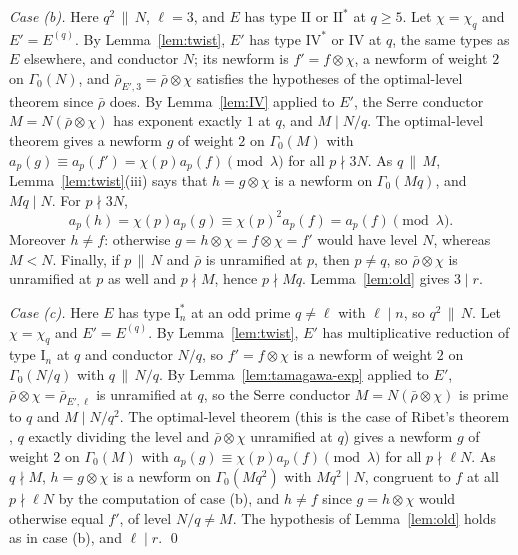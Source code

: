 \documentclass[11pt]{amsart}
\theoremstyle{definition}
\begin{document}
\medskip\noindent\emph{Case (b).} Here $q^2\,\|\,N$, $\ell=3$, and $E$ has type $\mathrm{II}$ or $\mathrm{II}^*$ at $q\ge5$. Let $\chi=\chi_q$ and $E'=E^{(q)}$. By Lemma~\ref{lem:twist}, $E'$ has type $\mathrm{IV}^*$ or $\mathrm{IV}$ at $q$, the same types as $E$ elsewhere, and conductor $N$; its newform is $f'=f\otimes\chi$, a newform of weight $2$ on $\Gamma_0(N)$, and $\bar\rho_{E',3}=\bar\rho\otimes\chi$ satisfies the hypotheses of the optimal-level theorem since $\bar\rho$ does. By Lemma~\ref{lem:IV} applied to $E'$, the Serre conductor $M=N(\bar\rho\otimes\chi)$ has exponent exactly $1$ at $q$, and $M\mid N/q$. The optimal-level theorem gives a newform $g$ of weight $2$ on $\Gamma_0(M)$ with $a_p(g)\equiv a_p(f')=\chi(p)a_p(f)\pmod\lambda$ for all $p\nmid 3N$. As $q\,\|\,M$, Lemma~\ref{lem:twist}(iii) says that $h=g\otimes\chi$ is a newform on $\Gamma_0(Mq)$, and $Mq\mid N$. For $p\nmid 3N$,
\[
a_p(h)=\chi(p)a_p(g)\equiv\chi(p)^2a_p(f)=a_p(f)\pmod\lambda .
\]
Moreover $h\ne f$: otherwise $g=h\otimes\chi=f\otimes\chi=f'$ would have level $N$, whereas $M<N$. Finally, if $p\,\|\,N$ and $\bar\rho$ is unramified at $p$, then $p\ne q$, so $\bar\rho\otimes\chi$ is unramified at $p$ as well and $p\nmid M$, hence $p\nmid Mq$. Lemma~\ref{lem:old} gives $3\mid r$.

\medskip\noindent\emph{Case (c).} Here $E$ has type $\mathrm{I}_n^*$ at an odd prime $q\ne\ell$ with $\ell\mid n$, so $q^2\,\|\,N$. Let $\chi=\chi_q$ and $E'=E^{(q)}$. By Lemma~\ref{lem:twist}, $E'$ has multiplicative reduction of type $\mathrm{I}_n$ at $q$ and conductor $N/q$, so $f'=f\otimes\chi$ is a newform of weight $2$ on $\Gamma_0(N/q)$ with $q\,\|\,N/q$. By Lemma~\ref{lem:tamagawa-exp} applied to $E'$, $\bar\rho\otimes\chi=\bar\rho_{E',\ell}$ is unramified at $q$, so the Serre conductor $M=N(\bar\rho\otimes\chi)$ is prime to $q$ and $M\mid N/q^2$. The optimal-level theorem (this is the case of Ribet's theorem \cite{Ribet90}, $q$ exactly dividing the level and $\bar\rho\otimes\chi$ unramified at $q$) gives a newform $g$ of weight $2$ on $\Gamma_0(M)$ with $a_p(g)\equiv\chi(p)a_p(f)\pmod\lambda$ for all $p\nmid\ell N$. As $q\nmid M$, $h=g\otimes\chi$ is a newform on $\Gamma_0(Mq^2)$ with $Mq^2\mid N$, congruent to $f$ at all $p\nmid\ell N$ by the computation of case (b), and $h\ne f$ since $g=h\otimes\chi$ would otherwise equal $f'$, of level $N/q\ne M$. The hypothesis of Lemma~\ref{lem:old} holds as in case (b), and $\ell\mid r$. \qed
\end{document}
